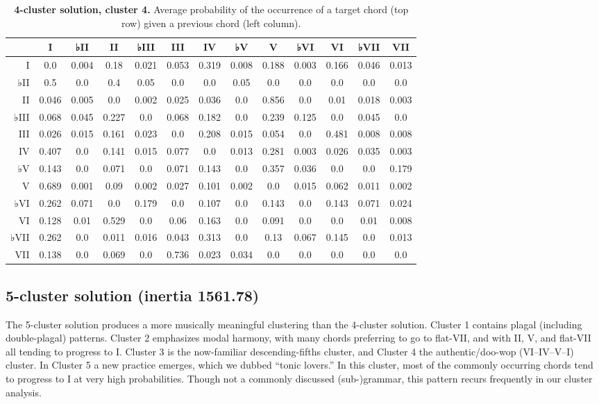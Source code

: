 \begin{table}[htbp]
\begin{minipage}{\linewidth}
\setlength{\tymax}{0.5\linewidth}
\centering
\small
\caption{\textbf{4-cluster solution, cluster 4.} Average probability of the occurrence of a target chord (top row) given a previous chord (left column).}
\label{4-clustersolutioncluster4.averageprobabilityoftheoccurrenceofatargetchordtoprowgivenapreviouschordleftcolumn.}
\begin{tabulary}{\textwidth}{@{}RCCCCCCCCCCCC@{}} \toprule
&I&♭II&II&♭III&III&IV&♭V&V&♭VI&VI&♭VII&VII\\
\midrule
I&0.0&0.004&0.18&0.021&0.053&0.319&0.008&0.188&0.003&0.166&0.046&0.013\\
♭II&0.5&0.0&0.4&0.05&0.0&0.0&0.05&0.0&0.0&0.0&0.0&0.0\\
II&0.046&0.005&0.0&0.002&0.025&0.036&0.0&0.856&0.0&0.01&0.018&0.003\\
♭III&0.068&0.045&0.227&0.0&0.068&0.182&0.0&0.239&0.125&0.0&0.045&0.0\\
III&0.026&0.015&0.161&0.023&0.0&0.208&0.015&0.054&0.0&0.481&0.008&0.008\\
IV&0.407&0.0&0.141&0.015&0.077&0.0&0.013&0.281&0.003&0.026&0.035&0.003\\
♭V&0.143&0.0&0.071&0.0&0.071&0.143&0.0&0.357&0.036&0.0&0.0&0.179\\
V&0.689&0.001&0.09&0.002&0.027&0.101&0.002&0.0&0.015&0.062&0.011&0.002\\
♭VI&0.262&0.071&0.0&0.179&0.0&0.107&0.0&0.143&0.0&0.143&0.071&0.024\\
VI&0.128&0.01&0.529&0.0&0.06&0.163&0.0&0.091&0.0&0.0&0.01&0.008\\
♭VII&0.262&0.0&0.011&0.016&0.043&0.313&0.0&0.13&0.067&0.145&0.0&0.013\\
VII&0.138&0.0&0.069&0.0&0.736&0.023&0.034&0.0&0.0&0.0&0.0&0.0\\

\bottomrule

\end{tabulary}
\end{minipage}
\end{table}

\subsection{5-cluster solution (inertia 1561.78)}
\label{5-clustersolutioninertia1561.78}

The 5-cluster solution produces a more musically meaningful clustering than the 4-cluster solution. Cluster 1 contains plagal (including double-plagal) patterns. Cluster 2 emphasizes modal harmony, with many chords preferring to go to flat-VII, and with II, V, and flat-VII all tending to progress to I. Cluster 3 is the now-familiar descending-fifths cluster, and Cluster 4 the authentic\slash doo-wop (VI–IV–V–I) cluster. In Cluster 5 a new practice emerges, which we dubbed ``tonic lovers.'' In this cluster, most of the commonly occurring chords tend to progress to I at very high probabilities. Though not a commonly discussed (sub-)grammar, this pattern recurs frequently in our cluster analysis.

